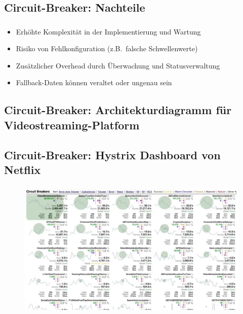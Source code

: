 \subsection{Circuit-Breaker: Nachteile}
\begin{frame}
    \frametitle{\insertsection}
    \framesubtitle{\insertsubsection}

    \begin{itemize}
        \item Erhöhte Komplexität in der Implementierung und Wartung
        \item Risiko von Fehlkonfiguration (z.B.\ falsche Schwellenwerte)
        \item Zusätzlicher Overhead durch Überwachung und Statusverwaltung
        \item Fallback-Daten können veraltet oder ungenau sein
    \end{itemize}
\end{frame}

\subsection{Circuit-Breaker: Architekturdiagramm für Videostreaming-Platform}
\begin{frame}
    \frametitle{\insertsection}
    \framesubtitle{\insertsubsection}

    \vspace*{-14pt}
    \begin{figure}[h]
        \centering
		\resizebox{!}{.72\textheight}{%
			
		}
		\captionsetup{aboveskip=2pt}
    \end{figure}
\end{frame}

\subsection{Circuit-Breaker: Hystrix Dashboard von Netflix\cite{Schmaus.11.12.2012}}
\begin{frame}
    \frametitle{\insertsection}
    \framesubtitle{\insertsubsection}

    \vspace*{-14pt}
    \begin{figure}[h]
        \centering
        \includegraphics[height=0.68\textheight]{../images/Hystrix-Dashboard}
    \end{figure}
\end{frame}

